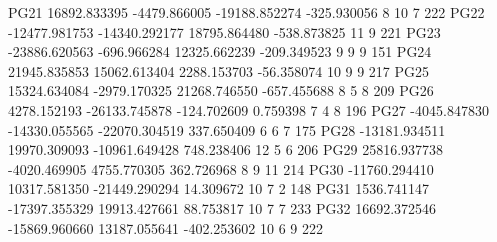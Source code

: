 PG21  16892.833395  -4479.866005 -19188.852274   -325.930056  8 10  7 222       
PG22 -12477.981753 -14340.292177  18795.864480   -538.873825 11  9    221       
PG23 -23886.620563   -696.966284  12325.662239   -209.349523  9  9  9 151       
PG24  21945.835853  15062.613404   2288.153703    -56.358074 10  9  9 217       
PG25  15324.634084  -2979.170325  21268.746550   -657.455688  8  5  8 209       
PG26   4278.152193 -26133.745878   -124.702609      0.759398  7  4  8 196       
PG27  -4045.847830 -14330.055565 -22070.304519    337.650409  6  6  7 175       
PG28 -13181.934511  19970.309093 -10961.649428    748.238406 12  5  6 206       
PG29  25816.937738  -4020.469905   4755.770305    362.726968  8  9 11 214       
PG30 -11760.294410  10317.581350 -21449.290294     14.309672 10  7  2 148       
PG31   1536.741147 -17397.355329  19913.427661     88.753817 10  7  7 233       
PG32  16692.372546 -15869.960660  13187.055641   -402.253602 10  6  9 222       
